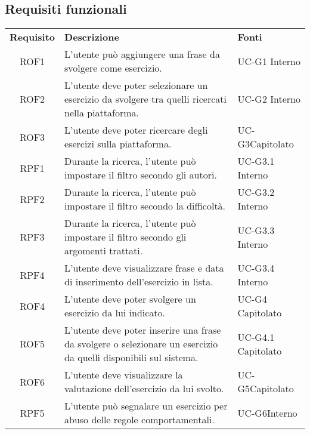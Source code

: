 \subsection{Requisiti funzionali}
\begin{tabularx}{\textwidth}{| c | p{10cm} | X |}
		\rowcolor{LightBlue}
		\color{white}\bfseries Requisito & \color{white}\bfseries Descrizione & \color{white}\bfseries Fonti\\[0.25cm]
		ROF1 & L'utente può aggiungere una frase da svolgere come esercizio. & UC-G1 \newline Interno\\
		ROF2 & L'utente deve poter selezionare un esercizio da svolgere tra quelli ricercati nella piattaforma. & UC-G2 \newline Interno\\
		ROF3 & L'utente deve poter ricercare degli esercizi sulla piattaforma. & UC-G3\newline Capitolato\\
		RPF1 & Durante la ricerca, l'utente può impostare il filtro secondo gli autori. & UC-G3.1 \newline Interno\\
		RPF2 & Durante la ricerca, l'utente può impostare il filtro secondo la difficoltà. & UC-G3.2 \newline Interno\\
		RPF3 & Durante la ricerca, l'utente può impostare il filtro secondo gli argomenti trattati. & UC-G3.3 \newline Interno\\
		RPF4 & L'utente deve visualizzare frase e data di inserimento dell'esercizio in lista. & UC-G3.4 \newline Interno\\
		ROF4 & L'utente deve poter svolgere un esercizio da lui indicato. & UC-G4 \newline Capitolato\\
		ROF5 & L'utente deve poter inserire una frase da svolgere o selezionare un esercizio da quelli disponibili sul sistema. & UC-G4.1 \newline Capitolato\\
		ROF6 & L'utente deve visualizzare la valutazione dell'esercizio da lui svolto. & UC-G5\newline Capitolato\\
		RPF5 & L'utente può segnalare un esercizio per abuso delle regole comportamentali. & UC-G6\newline Interno\\
		

\end{tabularx}
